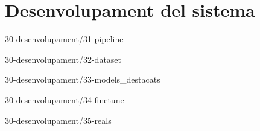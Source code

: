 \chapter{Desenvolupament del sistema}

{30-desenvolupament/31-pipeline}

{30-desenvolupament/32-dataset}

{30-desenvolupament/33-models_destacats}

{30-desenvolupament/34-finetune}

{30-desenvolupament/35-reals}





\begin{comment}
3 Desenvolupament del sistema
    3.1 Arquitectura del sistema (pipeline)
    3.2 Creació dataset sintètic
    [?] 3.3 Creació de tests
    3.4 Fine-tune sintètic
    3.5 Dataset i fine-tune amb dades reals
        3.5.1 Estadístiques descriptives
        3.5.2 Tendències i patrons
        3.5.3 Problemes i incidències comunes
        3.5.4 Anomalies i valors atípics
    3.6 Desplegament API
\end{comment}

